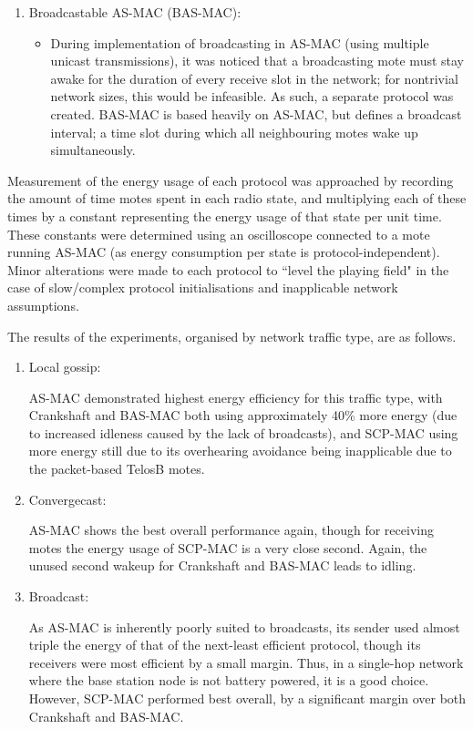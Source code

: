 \begin{enumerate}
	\item Broadcastable AS-MAC (BAS-MAC):
	\begin{itemize}
		\item During implementation of broadcasting in AS-MAC (using multiple unicast transmissions), it was noticed that a broadcasting mote must stay awake for the duration of every receive slot in the network; for nontrivial network sizes, this would be infeasible. As such, a separate protocol was created. BAS-MAC is based heavily on AS-MAC, but defines a broadcast interval; a time slot during which all neighbouring motes wake up simultaneously.
	\end{itemize}
\end{enumerate}

Measurement of the energy usage of each protocol was approached by recording the amount of time motes spent in each radio state, and multiplying each of these times by a constant representing the energy usage of that state per unit time. These constants were determined using an oscilloscope connected to a mote running AS-MAC (as energy consumption per state is protocol-independent). Minor alterations were made to each protocol to  ``level the playing field" in the case of slow/complex protocol initialisations and inapplicable network assumptions.

The results of the experiments, organised by network traffic type, are as follows.
\begin{enumerate}
	\item Local gossip:
	
	AS-MAC demonstrated highest energy efficiency for this traffic type, with Crankshaft and BAS-MAC both using approximately 40\% more energy (due to increased idleness caused by the lack of broadcasts), and SCP-MAC using more energy still due to its overhearing avoidance being inapplicable due to the packet-based TelosB motes.
	
	\item Convergecast:
	
	AS-MAC shows the best overall performance again, though for receiving motes the energy usage of SCP-MAC is a very close second. Again, the unused second wakeup for Crankshaft and BAS-MAC leads to idling.
	
	\item Broadcast:
	
	As AS-MAC is inherently poorly suited to broadcasts, its sender used almost triple the energy of that of the next-least efficient protocol, though its receivers were most efficient by a small margin. Thus, in a single-hop network where the base station node is not battery powered, it is a good choice. However, SCP-MAC performed best overall, by a significant margin over both Crankshaft and BAS-MAC.
\end{enumerate}

